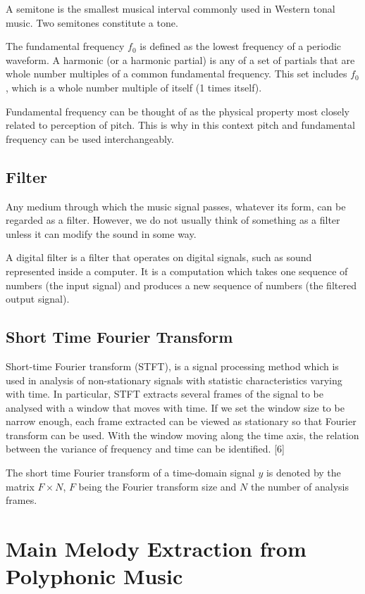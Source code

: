 A semitone is the smallest musical interval commonly used in Western tonal music. Two semitones constitute a tone.

The fundamental frequency $f_{\text{0}}$ is defined as the lowest frequency of a periodic waveform. A harmonic (or a harmonic partial) is any of a set of partials that are whole number multiples of a common fundamental frequency. This set includes $f_{0}$, which is a whole number multiple of itself (1 times itself).

Fundamental frequency can be thought of as the physical property most closely related to perception of pitch. This is why in this context pitch and fundamental frequency can be used interchangeably.


\subsection{Filter}

Any medium through which the music signal passes, whatever its form, can be regarded as a filter. However, we do not usually think of something as a filter unless it can modify the sound in some way. 

A digital filter is a filter that operates on digital signals, such as sound represented inside a computer. It is a computation which takes one sequence of numbers (the input signal) and produces a new sequence of numbers (the filtered output signal). 


\subsection{Short Time Fourier Transform}

Short-time Fourier transform (STFT), is a signal processing method which is used in analysis of non-stationary signals with statistic characteristics varying with time.
In particular, STFT extracts several frames of the signal to be analysed with a window that moves with time. If we set the window size to be narrow enough, each frame extracted can be viewed as stationary so that Fourier transform can be used. With the window moving along the time axis, the relation between the variance of frequency and time can be identified. [6]

The short time Fourier transform of a time-domain signal $y$ is denoted by the matrix $F \times N$, $F$ being the Fourier transform size and $N$ the number of analysis frames.

\section{Main Melody Extraction from Polyphonic Music}
